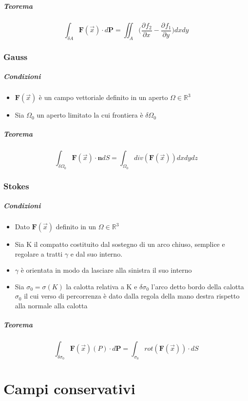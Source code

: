 \documentclass[10pt,a4paper]{report}
\newcommand{\pdv}[3]{\frac{\partial^{#2} #1}{\partial #3^{#2}}}
\begin{document}
			\subparagraph{Teorema}
			
			\[ \int_{\delta A} \mathbf{F}(\vec{x}) \cdot d \mathbf{P} = \iint_{A} \Big(\pdv{f_{2}}{}{x} - \pdv{f_{1}}{}{y}\Big) dxdy \]
			
			
			\subsubsection{Gauss}
				\subparagraph{Condizioni}
					\begin{itemize}
						\item $ \mathbf{F}(\vec{x}) $ è un campo vettoriale definito in un aperto $ \Omega \in \mathbb{R}^{3} $
						\item Sia $ \Omega_{0} $ un aperto limitato la cui frontiera è $ \delta \Omega_{0} $
					\end{itemize}
				\subparagraph{Teorema}
				\[ \int_{\delta \Omega_{0}} \mathbf{F}(\vec{x}) \cdot \mathbf{n} dS = \int_{\Omega_{0}} div(\mathbf{F}(\vec{x})) dxdydz \]
			
			\subsubsection{Stokes}
			
				\subparagraph{Condizioni}
				\begin{itemize}
					\item Dato $\mathbf{F}(\vec{x})$ definito in un $ \Omega \in \mathbb{R}^{3} $
					\item Sia K il compatto costituito dal sostegno di un arco chiuso, semplice e regolare a tratti $ \gamma $ e dal suo interno.
					\item $ \gamma $ è orientata in modo da lasciare alla sinistra il suo interno
					\item Sia $ \sigma_{0} = \sigma(K) $ la calotta relativa a K e $ \delta \sigma_{0} $ l'arco detto bordo della calotta $ \sigma_{0} $  il cui verso di percorrenza è dato dalla regola della mano destra  rispetto alla normale alla calotta
				\end{itemize}
				\subparagraph{Teorema}
				\[ \int_{\delta \sigma_{0}} \mathbf{F}(\vec{x})(P) \cdot d \mathbf{P} = \int_{ \sigma_{0}} rot(\mathbf{F}(\vec{x})) \cdot d S\]




	
	\section*{Campi conservativi}
    
\end{document}
